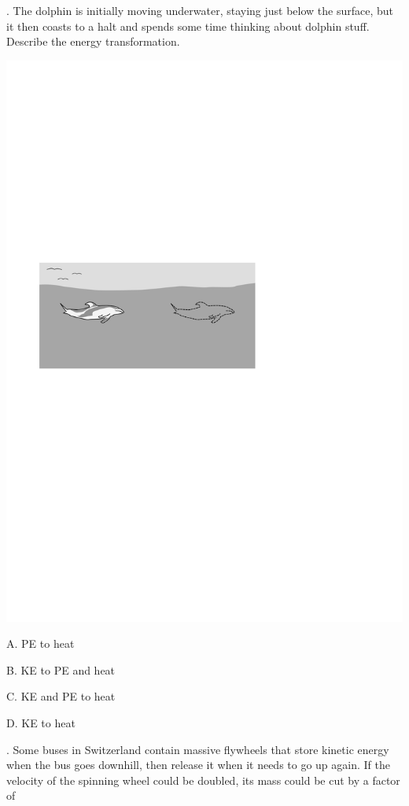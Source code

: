 \documentclass[20pt]{extarticle}
\begin{document}

. The dolphin is initially moving underwater, staying just below the surface, but it then coasts to
a halt and spends some time thinking about dolphin stuff. Describe the energy transformation.

\includegraphics{figs/dolphin-energy}

A. PE to heat

B. KE to PE and heat

C. KE and PE to heat

D. KE to heat


\pagebreak



. Some buses in Switzerland contain massive flywheels that store
kinetic energy when the bus goes downhill, then release it when it needs to
go up again. If the velocity of the spinning wheel could be doubled, its
mass could be cut by a factor of
\end{document}
